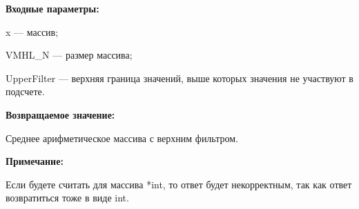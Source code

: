 \textbf{Входные параметры:}

 x --- массив;
 
 VMHL\_N --- размер массива;
 
 UpperFilter --- верхняя граница значений, выше которых значения не участвуют в подсчете.

\textbf{Возвращаемое значение:}

 Среднее арифметическое массива с верхним фильтром.
 
\textbf{Примечание:}

Если будете считать для массива *int, то ответ будет некорректным, так как ответ возвратиться тоже в виде int.
 
